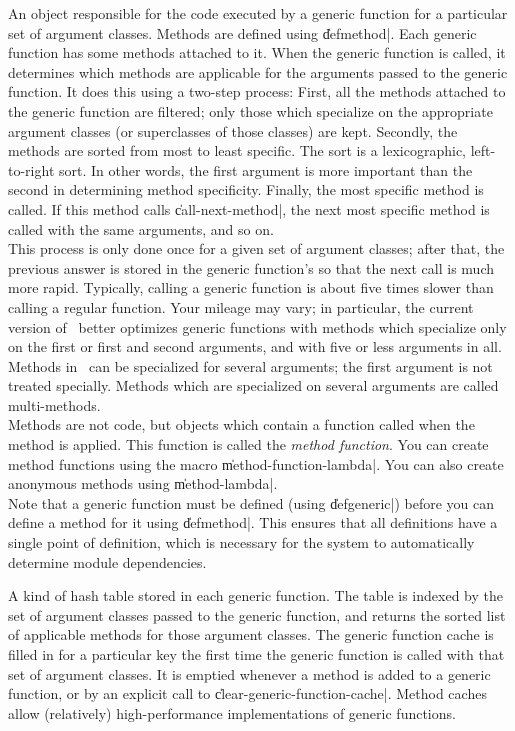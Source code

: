 \begin{description}
	{An object responsible for the code executed by a generic
	function for a particular set of argument classes.  Methods
	are defined using \|defmethod|. Each generic function has some
	methods attached to it.  When the generic function is called,
	it determines which methods are applicable for the arguments
	passed to the generic function.  It does this using a two-step
	process: First, all the methods attached to the generic
	function are filtered; only those which specialize on the
	appropriate argument classes (or superclasses of those
	classes) are kept.  Secondly, the methods are sorted from most
	to least specific.  The sort is a lexicographic, left-to-right
	sort.  In other words, the first argument is more important
	than the second in determining method specificity.  Finally,
	the most specific method is called.  If this method calls
	\|call-next-method|, the next most specific method is called
	with the same arguments, and so on.  \\
	This process is only done once for a given set of argument
	classes; after that, the previous answer is stored in the
	generic function's  so that the next call
	is much more rapid.  Typically, calling a generic function is
	about five times slower than calling a regular function.  Your
	mileage may vary; in particular, the current version of \Talk\
	better optimizes generic functions with methods which
	specialize only on the first or first and second arguments,
	and with five or less arguments in all. \\
	Methods in \Talk\ can be specialized for several arguments;
	the first argument is not treated specially.  Methods which
	are specialized on several arguments are called multi-methods. \\
	Methods are not code, but objects which contain a function
	called when the method is applied.  This function is called
	the {\em method function}.  You can create method functions
	using the macro \|method-function-lambda|.  You can also
	create anonymous methods using \|method-lambda|.\\
	Note that a generic function must be defined (using
	\|defgeneric|) before you can define a method for it using
	\|defmethod|.  This ensures that all definitions have a single
	point of definition, which is necessary for the system to
	automatically determine module dependencies.}

	{A kind of hash table stored in each generic function.  The
	table is indexed by the set of argument classes passed to the
	generic function, and returns the sorted list of applicable
	methods for those argument classes.  The generic function
	cache is filled in for a particular key the first time the
	generic function is called with that set of argument classes.
	It is emptied whenever a method is added to a generic
	function, or by an explicit call to
	\|clear-generic-function-cache|.  Method caches allow
	(relatively) high-performance implementations of generic functions.}


\end{description}

